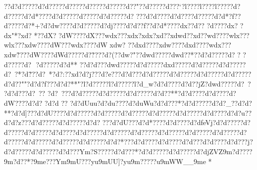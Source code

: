 ??d?d?????d?d?????d?\?????d?\?????d?\*????d?\??"??d?\?????d?\???`?l?\????l?\????l?\?????d?d?????d?d*????d?d?????d?\?????d?d?????d?\? ???d?d????d?d????d?\?????d?d*?f??d?\?????d?\?*+?d?dw????d?d?????d?dj????d?d??f??d?d*????dx\ ??d?\?? ?d?\????dx\?? ?dx\?"*?xd?\*
*??dX\?? 
?dW\?????dX\????wdx\????xdx\??xdx\??xd?\??xdwd??xd?\??wd?\????wlx\????wlx\????xdw\?????dW\????wdx\?????dW\?

xdw\? ??dxd????xdw\?????dxd????wdx\????xdw\"????dW\????dWd?????d?\"????d?\(? ?dw\*?"??dwd?????dwd??*??d?d?????d?\  ?
?d?\?????d?\  
?d?\?????d?d** ??d?d???dwd?????d?d?????dxd?????d?d?????d?d?????d?\  ?*?d?\" ??d?\   *?d?\?:??xd?d?j???\?d?e???d?d???d?d?????d?d?????d?d?????d?d?????d?d??""?d?d?f???d?d?**"?l?d?????l?d?????l?d_w?d?d?? ??d?d??jZ?dwd?????d?\ ?  ?d?d  ???d?\ ?? ?d?\ ???d?d?????d?d?????d?d?????d?d??**?d?d????d?d????d?dW????d?d?
 ?d?d ?? ?d?dUuu?d?du????d?duWu?d?d???*?d?d?????d?d?_??d?d?** ?d?d]???d?dU????d?d?????d?d?????d?d?????d?d?????d?d?????d?d????d?d?u??d?d?z???d?d?????d?d?????d?d? ???d?dU???d?d*????d?d????d?dfeVj?d?d?????d?d?????d?d?????d?d????d?d?????d?d?????d?d?????d?d?????d?d?????d?d?????d?d?????d?d?????d?d?????d?d?????d?d?*???d?d????d?d????d?d???d?d????d?d???j?d?d?????d?d?????d?d???Ym?S?????d?d???*?d?d?????d?d?????d?djZVZ9m?d????9m?d??*?9me??? Ym9mU???yu9mUU]?yu9m?????u9mWW__9me *

